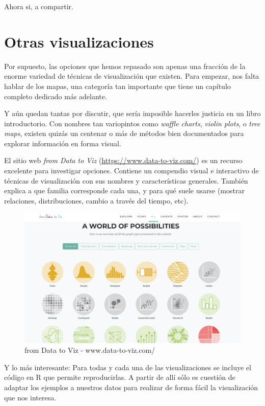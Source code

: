 \documentclass[]{book}
\begin{document}
Ahora si, a compartir.

\section{Otras visualizaciones}\label{otras-visualizaciones}

Por supuesto, las opciones que hemos repasado son apenas una fracción de
la enorme variedad de técnicas de visualización que existen. Para
empezar, nos falta hablar de los mapas, una categoría tan importante que
tiene un capítulo completo dedicado más adelante.

Y aún quedan tantas por discutir, que sería imposible hacerles justicia
en un libro introductorio. Con nombres tan variopintos como \emph{waffle
charts}, \emph{violin plots}, o \emph{tree maps}, existen quizás un
centenar o más de métodos bien documentados para explorar información en
forma visual.

El sitio web \emph{from Data to Viz}
(\url{https://www.data-to-viz.com/}) es un recurso excelente para
investigar opciones. Contiene un compendio visual e interactivo de
técnicas de visualización con sus nombres y características generales.
También explica a que familia corresponde cada una, y para qué suele
usarse (mostrar relaciones, distribuciones, cambio a través del tiempo,
etc).

\begin{figure}
\includegraphics[width=1\linewidth]{imagenes/data_to_viz} \caption{from Data to Viz - www.data-to-viz.com/}\label{fig:unnamed-chunk-106}
\end{figure}

Y lo más interesante: Para todas y cada una de las visualizaciones se
incluye el código en R que permite reproducirlas. A partir de allí sólo
es cuestión de adaptar los ejemplos a nuestros datos para realizar de
forma fácil la visualización que nos interesa.
\end{document}
